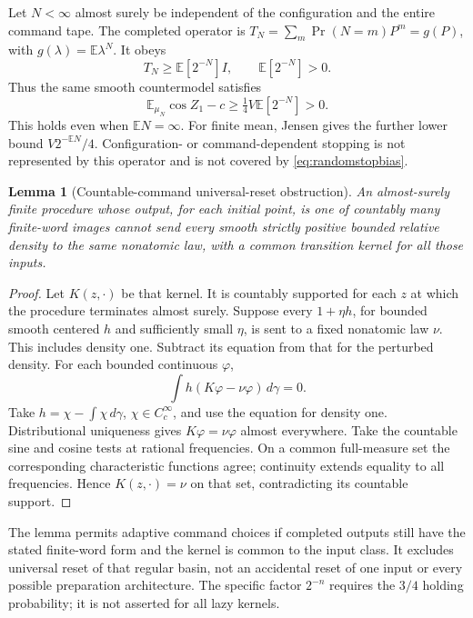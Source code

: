\documentclass[11pt]{article}
\numberwithin{equation}{section}
\newtheorem{lemma}[lemma]{Lemma}
\theoremstyle{definition}
\begin{document}
Let $N<\infty$ almost surely be independent of the configuration and the entire command tape. The completed operator is $T_N=\sum_m\Pr(N=m)P^m=g(P)$, with $g(\lambda)=\mathbb E\lambda^N$. It obeys
\[
 T_N\ge\mathbb E[2^{-N}]I,\qquad \mathbb E[2^{-N}]>0.
\]
Thus the same smooth countermodel satisfies
\begin{equation}\label{eq:randomstopbias}
 \mathbb E_{\mu_N}\cos Z_1-c
 \ge\tfrac14V\mathbb E[2^{-N}]>0.
\end{equation}
This holds even when $\mathbb EN=\infty$. For finite mean, Jensen gives the further lower bound $V2^{-\mathbb EN}/4$. Configuration- or command-dependent stopping is not represented by this operator and is not covered by \eqref{eq:randomstopbias}.

\begin{lemma}[Countable-command universal-reset obstruction]\label{lem:countablereset}
An almost-surely finite procedure whose output, for each initial point, is one of countably many finite-word images cannot send every smooth strictly positive bounded relative density to the same nonatomic law, with a common transition kernel for all those inputs.
\end{lemma}
\begin{proof}
Let $K(z,\cdot)$ be that kernel. It is countably supported for each $z$ at which the procedure terminates almost surely. Suppose every $1+\eta h$, for bounded smooth centered $h$ and sufficiently small $\eta$, is sent to a fixed nonatomic law $\nu$. This includes density one. Subtract its equation from that for the perturbed density. For each bounded continuous $\varphi$,
\[
 \int h(K\varphi-\nu\varphi)\,d\gamma=0.
\]
Take $h=\chi-\int\chi\,d\gamma$, $\chi\in C_c^\infty$, and use the equation for density one. Distributional uniqueness gives $K\varphi=\nu\varphi$ almost everywhere. Take the countable sine and cosine tests at rational frequencies. On a common full-measure set the corresponding characteristic functions agree; continuity extends equality to all frequencies. Hence $K(z,\cdot)=\nu$ on that set, contradicting its countable support.
\end{proof}
The lemma permits adaptive command choices if completed outputs still have the stated finite-word form and the kernel is common to the input class. It excludes universal reset of that regular basin, not an accidental reset of one input or every possible preparation architecture. The specific factor $2^{-n}$ requires the $3/4$ holding probability; it is not asserted for all lazy kernels.
\end{document}
